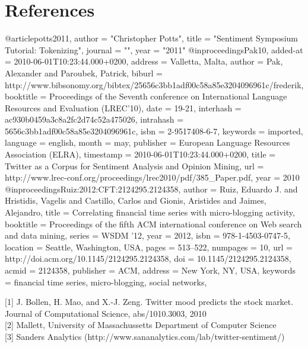 \documentclass[letterpaper]{article}
\begin{document}
\section{References}
\begin{thebibliography}{99}
@article{potts2011,
    author    = "Christopher Potts",
    title     = "Sentiment Symposium Tutorial: Tokenizing",
    journal   = "",
    year      = "2011"
}
@inproceedings{Pak10,
  added-at = {2010-06-01T10:23:44.000+0200},
  address = {Valletta, Malta},
  author = {Pak, Alexander and Paroubek, Patrick},
  biburl = {http://www.bibsonomy.org/bibtex/25656c3bb1adf00c58a85e3204096961c/frederik},
  booktitle = {Proceedings of the Seventh conference on International Language Resources and Evaluation (LREC'10)},
  date = {19-21},
  interhash = {ac930b0459a3c8a2fc2d74c52a475026},
  intrahash = {5656c3bb1adf00c58a85e3204096961c},
  isbn = {2-9517408-6-7},
  keywords = {imported},
  language = {english},
  month = may,
  publisher = {European Language Resources Association (ELRA)},
  timestamp = {2010-06-01T10:23:44.000+0200},
  title = {Twitter as a Corpus for Sentiment Analysis and Opinion Mining},
  url = {http://www.lrec-conf.org/proceedings/lrec2010/pdf/385_Paper.pdf},
  year = 2010
}
@inproceedings{Ruiz:2012:CFT:2124295.2124358,
 author = {Ruiz, Eduardo J. and Hristidis, Vagelis and Castillo, Carlos and Gionis, Aristides and Jaimes, Alejandro},
 title = {Correlating financial time series with micro-blogging activity},
 booktitle = {Proceedings of the fifth ACM international conference on Web search and data mining},
 series = {WSDM '12},
 year = {2012},
 isbn = {978-1-4503-0747-5},
 location = {Seattle, Washington, USA},
 pages = {513--522},
 numpages = {10},
 url = {http://doi.acm.org/10.1145/2124295.2124358},
 doi = {10.1145/2124295.2124358},
 acmid = {2124358},
 publisher = {ACM},
 address = {New York, NY, USA},
 keywords = {financial time series, micro-blogging, social networks},
} 
\end{thebibliography}

[1] J. Bollen, H. Mao, and X.-J. Zeng. Twitter mood predicts the
stock market. Journal of Computational Science,
abs/1010.3003, 2010\\

[2] Mallett, University of Massachussetts Department of Computer Science\\

[3] Sanders Analytics (http://www.sananalytics.com/lab/twitter-sentiment/)
\end{document}
